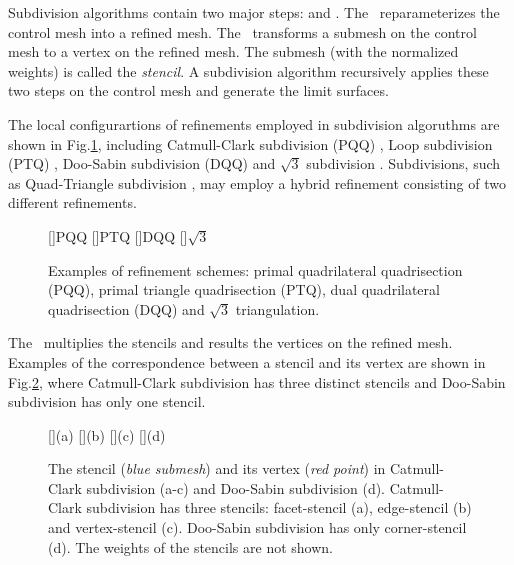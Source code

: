 
Subdivision algorithms \cite{Warren:subdivision, Sub:course:2000} 
contain two major steps: \emph{\tr} and \emph{\gm}.
The \tr\ reparameterizes the control mesh into a refined 
mesh. The \gm\ transforms a submesh on the control mesh
to a vertex on the refined mesh. The submesh (with
the normalized weights) is called the
\emph{stencil}. A subdivision algorithm recursively 
applies these two steps on the control mesh and generate
the limit surfaces. 

The local configurartions of refinements employed in subdivision
algoruthms are shown in Fig.\ref{fig:RefSchemes}, including Catmull-Clark
subdivision (PQQ) \cite{cc}, Loop subdivision (PTQ) \cite{loop},
Doo-Sabin subdivision (DQQ) \cite{ds} and $\sqrt{3}$ subdivision
\cite{sqrt3}. Subdivisions, such as Quad-Triangle subdivision 
\cite{qts,l-pg-03}, may employ a hybrid refinement consisting
of two different refinements.
\begin{figure}[htb]
  \centering
  []{\scriptsize PQQ} 
  []{\scriptsize PTQ}
  []{\scriptsize DQQ} 
  []{\scriptsize $\sqrt{3}$} 
  \caption{Examples of refinement schemes: 
    primal quadrilateral quadrisection (PQQ),
    primal triangle quadrisection (PTQ),
    dual quadrilateral quadrisection (DQQ) and
    $\sqrt{3}$ triangulation.}
  \label{fig:RefSchemes}
\end{figure}
The \gm\ multiplies the stencils and
results the vertices on the refined mesh.
Examples of the correspondence between a stencil and its 
vertex are shown in Fig.\ref{fig:RefMap}, where 
Catmull-Clark subdivision has three distinct stencils 
and Doo-Sabin subdivision has only one stencil.
\begin{figure}
  \centering
  []{(a)}
  []{(b)}
  []{(c)}
  []{(d)}
  \caption{The stencil ({\itshape blue submesh}) 
           and its vertex ({\itshape red point}) in
	   Catmull-Clark subdivision (a-c)
           and Doo-Sabin subdivision (d). Catmull-Clark
           subdivision has three stencils: facet-stencil (a), 
           edge-stencil (b) and vertex-stencil (c). 
           Doo-Sabin subdivision has only corner-stencil (d).
	   The weights of the stencils are not shown.}
  \label{fig:RefMap}
\end{figure}


